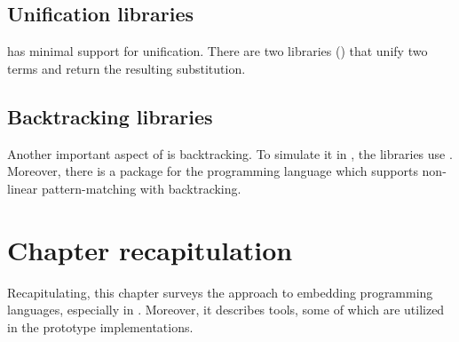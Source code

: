 \documentclass[thesis-solanki.tex]{subfiles}
\begin{document}
\subsection{Unification libraries}
 has minimal support for unification.
There are two libraries (\cite{cmu-lib,unification-fd-lib}) that unify two terms and return
the resulting substitution.

\subsection{Backtracking libraries}

Another important aspect of  is backtracking.
To simulate it in , the libraries \cite{stream-monad-lib, logicst-lib} use
.
Moreover, there is a package for the  programming language \cite{egison-lib} which supports
non-linear pattern-matching with backtracking.




\section{Chapter recapitulation}
Recapitulating, this chapter surveys the approach to embedding programming languages, especially 
in .
Moreover, it describes tools, some of which are utilized in the prototype implementations.

\ifMain\ifDraft
\begin{scope}
  \nolinenumbers
  \enotesize
  \par
  \begin{singlespace}
  \setlength{\parskip}{12pt plus 2pt minus 1pt}
  \theendnotes
  \par
  \end{singlespace}
\end{scope}
\fi\fi
\end{document}
